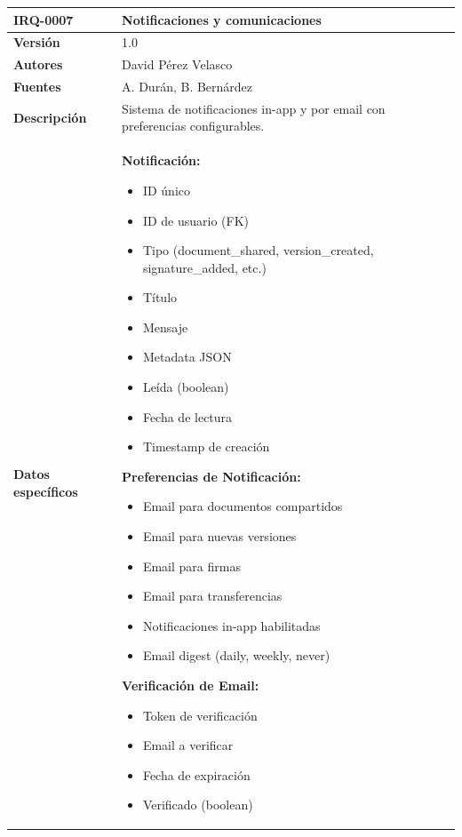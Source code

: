 \documentclass[11pt, a4paper]{article}
\begin{document}
\begin{table}[H]
    \centering
    \small
    \begin{tabular}{|p{4cm}|p{10cm}|}
    \hline
    \textbf{IRQ-0007} & Notificaciones y comunicaciones \\
    \hline
    \textbf{Versión} & 1.0 \\
    \hline
    \textbf{Autores} & David Pérez Velasco \\
    \hline
    \textbf{Fuentes} & A. Durán, B. Bernárdez \\
    \hline
    \textbf{Descripción} & Sistema de notificaciones in-app y por email con preferencias configurables. \\
    \hline
    \textbf{Datos específicos} & 
    \textbf{Notificación:}
    \begin{itemize}
        \item ID único
        \item ID de usuario (FK)
        \item Tipo (document\_shared, version\_created, signature\_added, etc.)
        \item Título
        \item Mensaje
        \item Metadata JSON
        \item Leída (boolean)
        \item Fecha de lectura
        \item Timestamp de creación
    \end{itemize}
    
    \textbf{Preferencias de Notificación:}
    \begin{itemize}
        \item Email para documentos compartidos
        \item Email para nuevas versiones
        \item Email para firmas
        \item Email para transferencias
        \item Notificaciones in-app habilitadas
        \item Email digest (daily, weekly, never)
    \end{itemize}
    
    \textbf{Verificación de Email:}
    \begin{itemize}
        \item Token de verificación
        \item Email a verificar
        \item Fecha de expiración
        \item Verificado (boolean)
    \end{itemize}
    

\end{tabular}
\end{table}
\end{document}
